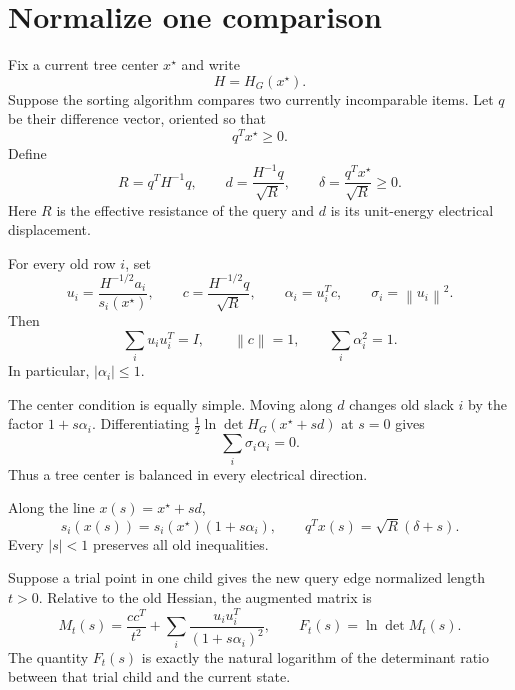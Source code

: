 \documentclass[11pt]{article}
\theoremstyle{definition}
\newcommand{\1}{\mathbf{1}}
\newcommand{\norm}[1]{\left\lVert #1\right\rVert}
\begin{document}
\section{Normalize one comparison}

Fix a current tree center $x^\star$ and write
\[
H=H_G(x^\star).
\]
Suppose the sorting algorithm compares two currently incomparable items.  Let $q$ be their difference vector, oriented so that
\[
q^Tx^\star\ge0.
\]
Define
\begin{equation}
R=q^TH^{-1}q,
\qquad
d=\frac{H^{-1}q}{\sqrt R},
\qquad
\delta=\frac{q^Tx^\star}{\sqrt R}\ge0.
\label{eq:electrical}
\end{equation}
Here $R$ is the effective resistance of the query and $d$ is its unit-energy electrical displacement.

For every old row $i$, set
\begin{equation}
u_i=\frac{H^{-1/2}a_i}{s_i(x^\star)},
\qquad
c=\frac{H^{-1/2}q}{\sqrt R},
\qquad
\alpha_i=u_i^Tc,
\qquad
\sigma_i=\norm{u_i}^2.
\label{eq:whitening}
\end{equation}
Then
\begin{equation}
\sum_i u_i u_i^T=I,
\qquad
\norm{c}=1,
\qquad
\sum_i\alpha_i^2=1.
\label{eq:isotropy}
\end{equation}
In particular, $|\alpha_i|\le1$.

The center condition is equally simple.  Moving along $d$ changes old slack $i$ by the factor $1+s\alpha_i$.  Differentiating $\frac12\ln\det H_G(x^\star+sd)$ at $s=0$ gives
\begin{equation}
\sum_i\sigma_i\alpha_i=0.
\label{eq:center-balance}
\end{equation}
Thus a tree center is balanced in every electrical direction.

Along the line $x(s)=x^\star+sd$,
\begin{equation}
s_i(x(s))=s_i(x^\star)(1+s\alpha_i),
\qquad
q^Tx(s)=\sqrt R(\delta+s).
\label{eq:slack-motion}
\end{equation}
Every $|s|<1$ preserves all old inequalities.

Suppose a trial point in one child gives the new query edge normalized length $t>0$.  Relative to the old Hessian, the augmented matrix is
\begin{equation}
M_t(s)=\frac{cc^T}{t^2}
       +\sum_i\frac{u_i u_i^T}{(1+s\alpha_i)^2},
\qquad
F_t(s)=\ln\det M_t(s).
\label{eq:Mt}
\end{equation}
The quantity $F_t(s)$ is exactly the natural logarithm of the determinant ratio between that trial child and the current state.
\end{document}
